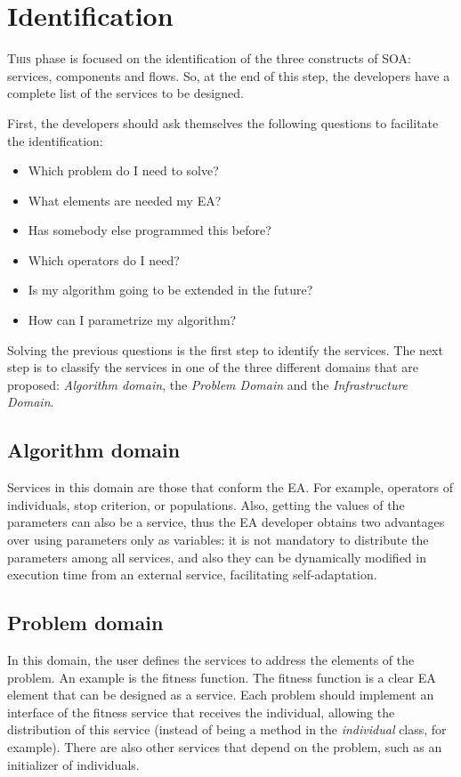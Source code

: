 \section{Identification}
\label{subsec:soaea:identification}

\lettrine{T}{his} phase is focused on the identification of the three constructs of SOA: services, components and flows. So, at the end of this step, the developers have a complete list of the services to be designed.

First, the developers should ask themselves the following questions to facilitate the identification:
\begin{itemize}
\item Which problem do I need to solve?
\item What elements are needed my EA?
\item Has somebody else programmed this before?
\item Which operators do I need?
\item Is my algorithm going to be extended in the future?
\item How can I parametrize my algorithm?
\end{itemize}

Solving the previous questions is the first step to identify the services. The next step is to classify the services in one of the three different domains that are proposed: {\em Algorithm domain}, the {\em Problem Domain} and the {\em Infrastructure Domain}. 

\subsection{Algorithm domain} Services in this domain are those that conform the EA. For example, operators of individuals, stop criterion, or populations.
 Also, getting the values of the parameters can also be a
  service,  thus the EA developer obtains two advantages over using parameters only as variables: 
it is not mandatory to distribute the parameters among all services, and also they can be dynamically modified in execution time from an external service, facilitating self-adaptation.

\subsection{Problem domain} In this domain, the user defines the services to address the elements of the problem. An example is the fitness function. The fitness function is a clear EA element that can be designed as a service. Each problem should implement an interface
  of the fitness service that receives the individual, allowing the
  distribution of this service (instead of being a method in the {\em individual} class, for example). There are also other services that depend on the problem, such as an initializer of individuals.


